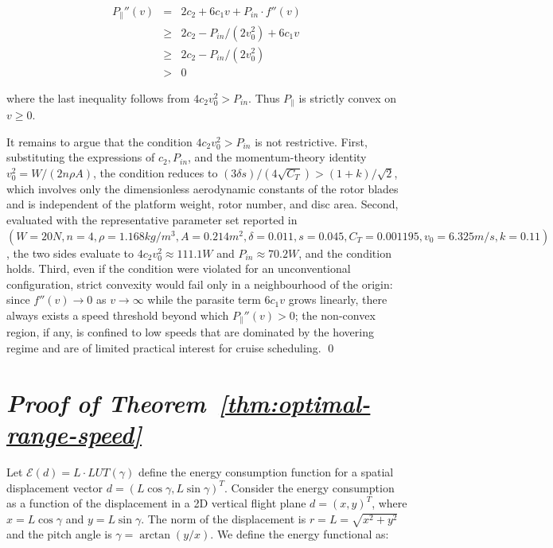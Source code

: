     \begin{eqnarray*}
        P_\parallel''(v)  & = & 2c_2 + 6c_1v + P_{in}\cdot f''(v) \\ 
                    & \geq & 2c_2 - P_{in}/(2v_0^2) + 6c_1v\\ 
                    & \geq & 2c_2 - P_{in}/(2v_0^2)\\ 
                        & > & 0 
    \end{eqnarray*}

    where the last inequality follows from $4c_2v_0^2 > P_{in}$.
    Thus $P_\parallel$ is strictly convex on $v \geq 0$. 


    It remains to argue that the condition $4c_2v_0^2 > P_{in}$ is not restrictive.
    First, substituting the expressions of $c_2, P_{in}$, and the momentum-theory identity $v_0^2 = W/(2n\rho A)$, the condition reduces to $(3\delta s)/(4\sqrt{C_T}) > (1+k)/\sqrt{2}$, which involves only the dimensionless aerodynamic constants of the rotor blades and is independent of the platform weight, rotor number, and disc area.
    Second, evaluated with the representative parameter set reported in~\cite{GongHao} $(W = 20 N, n = 4, \rho = 1.168 kg/m^3, A = 0.214 m^2, \delta = 0.011, s = 0.045, C_T = 0.001195, v_0 = 6.325 m/s, k = 0.11)$, the two sides evaluate to $4c_2v_0^2 \approx 111.1 W$ and $P_{in} \approx 70.2 W$, and the condition holds.
    Third, even if the condition were violated for an unconventional configuration, strict convexity would fail only in a neighbourhood of the origin: since $f''(v) \rightarrow  0$ as $v \rightarrow \infty $ while the parasite term $6c_1v$ grows linearly, there always exists a speed threshold beyond which $P_\parallel ''(v) > 0$; the non-convex region, if any, is confined to low speeds that are dominated by the hovering regime and are of limited practical interest for cruise scheduling.
    \qed

\section{\textit{Proof of Theorem~\ref{thm:optimal-range-speed}}}

\label{pro:Theorem optimal-range-speed}

Let $\mathcal{E}(d) = L \cdot LUT(\gamma)$ define the energy consumption function for a spatial displacement vector $d = (L \cos\gamma, L \sin\gamma)^T$.
Consider the energy consumption as a function of the displacement in a 2D vertical flight plane $d = (x, y)^T$, where $x = L \cos\gamma$ and $y = L \sin\gamma$.
The norm of the displacement is $r = L = \sqrt{x^2 + y^2}$ and the pitch angle is $\gamma = \arctan(y/x)$.
We define the energy functional as:

